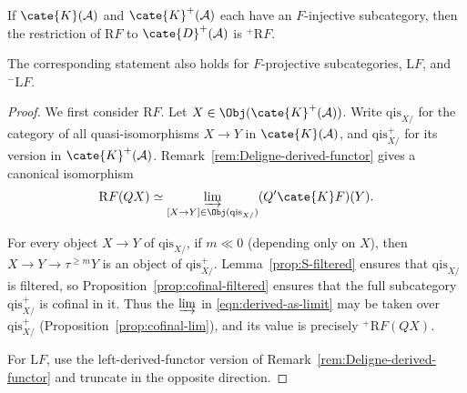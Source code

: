 \begin{lemma}\label{prop:derived-functor-res}
	If $\cate{K}(\mathcal{A})$ and $\cate{K}^+(\mathcal{A})$ each have an
	$F$-injective subcategory, then the restriction of $\mathrm{R}F$ to
	$\cate{D}^+(\mathcal{A})$ is ${}^+\mathrm{R}F$.

	The corresponding statement also holds for $F$-projective subcategories,
	$\mathrm{L}F$, and ${}^-\mathrm{L}F$.
\end{lemma}
\begin{proof}
	We first consider $\mathrm{R}F$. Let
	$X\in\Obj(\cate{K}^+(\mathcal{A}))$. Write $\mathrm{qis}_{X/}$ for the
	category of all quasi-isomorphisms $X\to Y$ in $\cate{K}(\mathcal{A})$,
	and $\mathrm{qis}^+_{X/}$ for its version in
	$\cate{K}^+(\mathcal{A})$. Remark~\ref{rem:Deligne-derived-functor} gives a
	canonical isomorphism
	\begin{equation}\label{eqn:derived-as-limit}\begin{aligned}
		\mathrm{R}F(QX) \simeq \varinjlim_{[X \to Y] \in \Obj(\mathrm{qis}_{X/})} (Q' \cate{K}F)(Y).
	\end{aligned}\end{equation}

	For every object $X\to Y$ of $\mathrm{qis}_{X/}$, if $m\ll0$
	(depending only on $X$), then
	$X\to Y\to\tau^{\geq m}Y$ is an object of
	$\mathrm{qis}^+_{X/}$. Lemma~\ref{prop:S-filtered} ensures that
	$\mathrm{qis}_{X/}$ is filtered, so Proposition~\ref{prop:cofinal-filtered}
	ensures that the full subcategory $\mathrm{qis}^+_{X/}$ is cofinal in it.
	Thus the $\varinjlim$ in \eqref{eqn:derived-as-limit} may be taken over
	$\mathrm{qis}^+_{X/}$ (Proposition~\ref{prop:cofinal-lim}), and its value is
	precisely ${}^+\mathrm{R}F(QX)$.

	For $\mathrm{L}F$, use the left-derived-functor version of
	Remark~\ref{rem:Deligne-derived-functor} and truncate in the opposite
	direction.
\end{proof}

